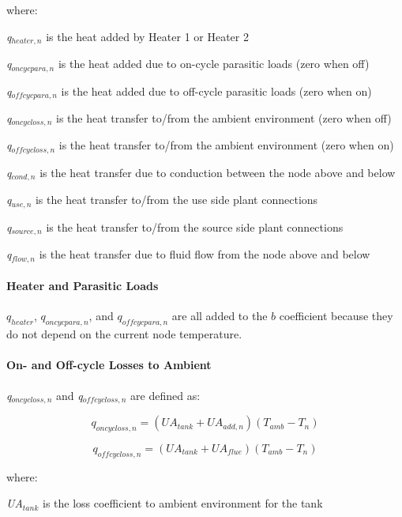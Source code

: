where:

\emph{q\(_{heater,n}\)} is the heat added by Heater 1 or Heater 2

\emph{q\(_{oncycpara,n}\)} is the heat added due to on-cycle parasitic loads (zero when off)

\emph{q\(_{offcycpara,n}\)} is the heat added due to off-cycle parasitic loads (zero when on)

\emph{q\(_{oncycloss,n}\)} is the heat transfer to/from the ambient environment (zero when off)

\emph{q\(_{offcycloss,n}\)} is the heat transfer to/from the ambient environment (zero when on)

\emph{q\(_{cond,n}\)} is the heat transfer due to conduction between the node above and below

\emph{q\(_{use,n}\)} is the heat transfer to/from the use side plant connections

\emph{q\(_{source,n}\)} is the heat transfer to/from the source side plant connections

\emph{q\(_{flow,n}\)} is the heat transfer due to fluid flow from the node above and below

\paragraph{Heater and Parasitic Loads}

$q_{heater}$, $q_{oncycpara,n}$, and $q_{offcycpara,n}$ are all added to the $b$ coefficient because they do not depend on the current node temperature.

\paragraph{On- and Off-cycle Losses to Ambient}

\emph{q\(_{oncycloss,n}\)} and \emph{q\(_{offcycloss,n}\)} are defined as:

\begin{equation}
{q_{oncycloss,n}} = ({UA_{tank}} + {UA_{add,n}})({T_{amb}} - {T_n})
\end{equation}

\begin{equation}
{q_{offcycloss,n}} = ({UA_{tank} + UA_{flue}})({T_{amb}} - {T_n})
\end{equation}

where:

\emph{UA\(_{tank}\)} is the loss coefficient to ambient environment for the tank

